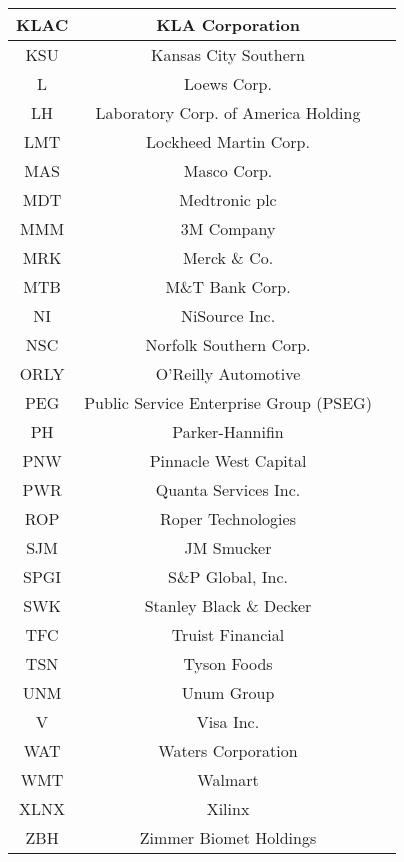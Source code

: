 \documentclass[11pt]{article}
\begin{document}
\begin{onehalfspace}
\begin{longtable}[h!]{|c|c|c|}
        KLAC & KLA Corporation \\ \hline
        KSU & Kansas City Southern \\ \hline
        L & Loews Corp. \\ \hline
        LH & Laboratory Corp. of America Holding \\ \hline
        LMT & Lockheed Martin Corp. \\ \hline
        MAS & Masco Corp. \\ \hline
        MDT & Medtronic plc \\ \hline
        MMM & 3M Company \\ \hline
        MRK & Merck \& Co. \\ \hline
        MTB & M\&T Bank Corp. \\ \hline
        NI & NiSource Inc. \\ \hline
        NSC & Norfolk Southern Corp. \\ \hline
        ORLY & O'Reilly Automotive \\ \hline
        PEG & Public Service Enterprise Group (PSEG) \\ \hline
        PH & Parker-Hannifin \\ \hline
        PNW & Pinnacle West Capital \\ \hline
        PWR & Quanta Services Inc. \\ \hline
        ROP & Roper Technologies \\ \hline
        SJM & JM Smucker \\ \hline
        SPGI & S\&P Global, Inc. \\ \hline
        SWK & Stanley Black \& Decker \\ \hline
        TFC & Truist Financial \\ \hline
        TSN & Tyson Foods \\ \hline
        UNM & Unum Group \\ \hline
        V & Visa Inc. \\ \hline
        WAT & Waters Corporation \\ \hline
        WMT & Walmart \\ \hline
        XLNX & Xilinx \\ \hline
        ZBH & Zimmer Biomet Holdings \\ \hline
\end{longtable}


\end{onehalfspace}
\end{document}
